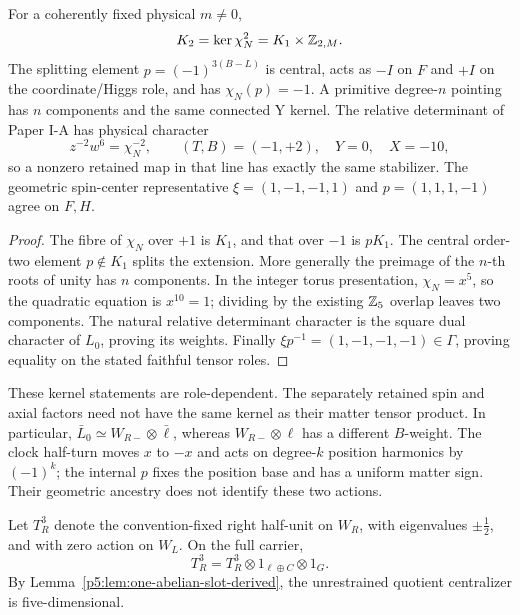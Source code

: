 \documentclass[11pt,a4paper]{article}
\begin{document}
\begin{proposition}
\label{p5:prop:quadratic-global-stabilizer-parity}
\label{p5:thm:faithful-quadratic-incidence-stabilizer}
For a coherently fixed physical \(m\ne0\),
\[
 K_2=\ker\chi_N^2=K_1\times\mathbb{Z}_{2,M}.
\]
The splitting element
\(p=(-1)^{3(B-L)}\) is central, acts as \(-I\) on \(F\)
and \(+I\) on the coordinate/Higgs role, and has
\(\chi_N(p)=-1\).  A primitive degree-\(n\) pointing has
\(n\) components and the same connected Y kernel.
The relative determinant of Paper I-A has physical character
\[
 z^{-2}w^6=\chi_N^{-2},\qquad (T,B)=(-1,+2),\quad
 Y=0,\quad X=-10,
\]
so a nonzero retained map in that line has exactly the same
stabilizer.  The geometric spin-center representative
\(\xi=(1,-1,-1,1)\) and \(p=(1,1,1,-1)\) agree on \(F,H\).
\end{proposition}
\begin{proof}
The fibre of \(\chi_N\) over \(+1\) is \(K_1\), and that
over \(-1\) is \(pK_1\).  The central order-two element
\(p\notin K_1\) splits the extension.  More generally the
preimage of the \(n\)-th roots of unity has \(n\) components.
In the integer torus presentation, \(\chi_N=x^5\), so the
quadratic equation is \(x^{10}=1\); dividing by the existing
\(\mathbb{Z}_5\) overlap leaves two components.  The natural
relative determinant character is the square dual
character of \(L_0\), proving its weights.  Finally
\(\xi p^{-1}=(1,-1,-1,-1)\in\Gamma\), proving equality on
the stated faithful tensor roles.
\end{proof}

These kernel statements are role-dependent.  The separately
retained spin and axial factors need not have the same kernel
as their matter tensor product.  In particular,
\(\bar L_0\simeq W_{R-}\otimes\bar\ell\), whereas
\(W_{R-}\otimes\ell\) has a different \(B\)-weight.  The
clock half-turn moves \(x\) to \(-x\) and acts on degree-\(k\)
position harmonics by \((-1)^k\); the internal \(p\) fixes
the position base and has a uniform matter sign.  Their
geometric ancestry does not identify these two actions.




Let \(T_R^3\) denote the convention-fixed right half-unit on \(W_R\), with eigenvalues
\(\pm\tfrac12\), and with zero action on \(W_L\).  On the full carrier,
\begin{equation}
\label{p5:eq:part1-TR3-full}
T_R^3 = T_R^3\otimes 1_{\ell\oplus C}\otimes 1_G.
\end{equation}
By Lemma~\ref{p5:lem:one-abelian-slot-derived}, the unrestrained quotient
centralizer is five-dimensional.
\end{document}
